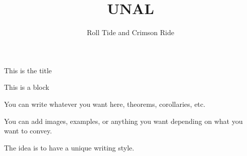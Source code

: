 \documentclass[aspectratio=88,xcolor=dvipsnames,10pt]{beamer}
\title[Mateo Manosalva Amaris]{UNAL}%
\author[UNAL]{Roll Tide\inst{1} and Crimson Ride\inst{1}}%
\date[\textcolor{white}{2023}]
\begin{document}
\begin{frame}{This is the title}
\large \justifying

\begin{block}{This is a block}

You can write whatever you want here, theorems, corollaries, etc.

\end{block}

You can add images, examples, or anything you want depending on what you want to convey.\vspace{0.5cm}

The idea is to have a unique writing style.
\end{frame}
\end{document}
